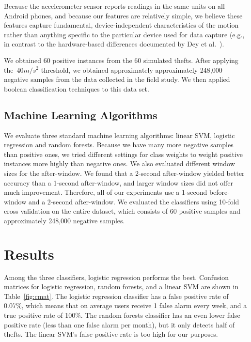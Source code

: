 Because the accelerometer sensor reports readings in the same units on all Android phones, and because our features are relatively simple, we believe these features capture fundamental, device-independent characteristics of the motion rather than anything specific to the particular device used for data capture (e.g., in contrast to the hardware-based differences documented by Dey et al.~\cite{Dey2014}).

We obtained 60 positive instances from the 60 simulated thefts.
After applying the~$40 m/s^2$ threshold, we obtained approximately approximately 248,000 negative samples from the data collected in the field study. 
We then applied boolean classification techniques to this data set.





\subsection{Machine Learning Algorithms}
We evaluate three standard machine learning algorithms: linear SVM, logistic regression and random forests.
Because we have many more negative samples than positive ones, we tried different settings for class weights to weight positive instances more highly than negative ones.
We also evaluated different window sizes for the after-window.
We found that a 2-second after-window yielded better accuracy than a 1-second after-window, and larger window sizes did not offer much improvement.
Therefore, all of our experiments use a 1-second before-window and a 2-second after-window.
We evaluated the classifiers using 10-fold cross validation on the entire dataset, which consists of 60 positive samples and approximately 248,000 negative samples. 



\section{Results}
Among the three classifiers, logistic regression performs the best.
Confusion matrices for logistic regression, random forests, and a linear SVM
are shown in Table~\ref{fig:cmat}.
The logistic regression classifier has a false positive rate of 0.07\%, which means that on average users receive 1 false alarm every week, and a true positive rate of 100\%.
The random forests classifier has an even lower false positive rate (less than one false alarm per month),
but it only detects half of thefts.
The linear SVM's false positive rate is too high for our purposes.


